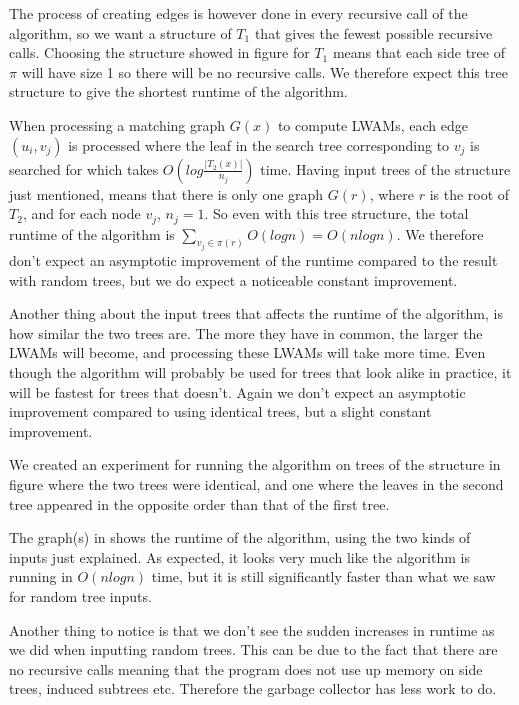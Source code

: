 The process of creating edges is however done in every recursive call of the algorithm, so we want a structure of $T_1$ that gives the fewest possible recursive calls. Choosing the structure showed in figure  for $T_1$ means that each side tree of $\pi$ will have size 1 so there will be no recursive calls. We therefore expect this tree structure to give the shortest runtime of the algorithm.

When processing a matching graph $G(x)$ to compute LWAMs, each edge $(u_i, v_j)$ is processed where the leaf in the search tree corresponding to $v_j$ is searched for which takes $O(log\frac{|T_2(x)|}{n_j})$ time. Having input trees of the structure just mentioned, means that there is only one graph $G(r)$, where $r$ is the root of $T_2$, and for each node $v_j$, $n_j = 1$. So even with this tree structure, the total runtime of the algorithm is $\sum_{v_j \in \pi(r)} O(log n) = O(nlogn)$. We therefore don't expect an asymptotic improvement of the runtime compared to the result with random trees, but we do expect a noticeable constant improvement.

Another thing about the input trees that affects the runtime of the algorithm, is how similar the two trees are. The more they have in common, the larger the LWAMs will become, and processing these LWAMs will take more time. Even though the algorithm will probably be used for trees that look alike in practice, it will be fastest for trees that doesn't. Again we don't expect an asymptotic improvement compared to using identical trees, but a slight constant improvement.

We created an experiment for running the algorithm on trees of the structure in figure  where the two trees were identical, and one where the leaves in the second tree appeared in the opposite order than that of the first tree.

The graph(s) in  shows the runtime of the algorithm, using the two kinds of inputs just explained. As expected, it looks very much like the algorithm is running in $O(nlogn)$ time, but it is still significantly faster than what we saw for random tree inputs.

Another thing to notice is that we don't see the sudden increases in runtime as we did when inputting random trees. This can be due to the fact that there are no recursive calls meaning that the program does not use up memory on side trees, induced subtrees etc. Therefore the garbage collector has less work to do.


